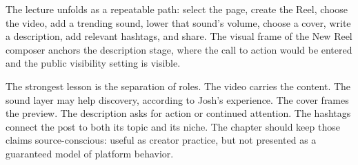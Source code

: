 The lecture unfolds as a repeatable path: select the page, create the Reel, choose the video, add a trending sound, lower that sound's volume, choose a cover, write a description, add relevant hashtags, and share. The visual frame of the New Reel composer anchors the description stage, where the call to action would be entered and the public visibility setting is visible.

The strongest lesson is the separation of roles. The video carries the content. The sound layer may help discovery, according to Josh's experience. The cover frames the preview. The description asks for action or continued attention. The hashtags connect the post to both its topic and its niche. The chapter should keep those claims source-conscious: useful as creator practice, but not presented as a guaranteed model of platform behavior.